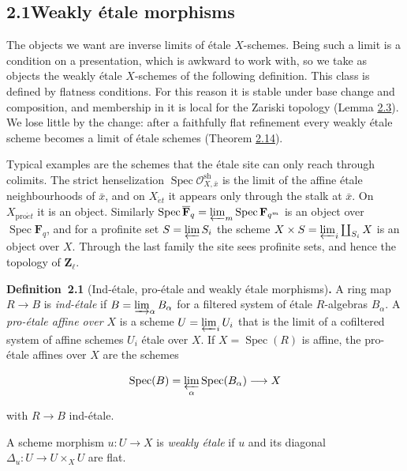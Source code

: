 \documentclass[11pt]{article}
\newenvironment{bpstatement}[2]{\par\addvspace{0.6\baselineskip}\noindent\textbf{#1}#2\textbf{.}\enspace\ignorespaces}
  {\par\addvspace{0.4\baselineskip}}
\begin{document}
\subsection*{\texorpdfstring{2.1\quad Weakly étale morphisms}{2.1 Weakly étale morphisms}}
\label{bp3}%
\label{bp4}%
The objects we want are inverse limits of étale \(X\)-schemes. Being such a limit is a condition on a presentation, which is awkward to work with, so we take as objects the weakly étale \(X\)-schemes of the following definition. This class is defined by flatness conditions. For this reason it is stable under base change and composition, and membership in it is local for the Zariski topology (Lemma \hyperref[bp10]{2.3}). We lose little by the change: after a faithfully flat refinement every weakly étale scheme becomes a limit of étale schemes (Theorem \hyperref[bp40]{2.14}).

Typical examples are the schemes that the étale site can only reach through colimits. The strict henselization \(\operatorname{Spec}\mathcal O^{\mathrm{sh}}_{X,\bar x}\) is the limit of the affine étale neighbourhoods of \(\bar x\), and on \(X_{\acute{e}t}\) it appears only through the stalk at \(\bar x\). On \(X_{\mathrm{pro}\acute{e}t}\) it is an object. Similarly \(\operatorname{Spec}\overline{\mathbf F}_q=\varprojlim_m\operatorname{Spec}\mathbf F_{q^m}\) is an object over \(\operatorname{Spec}\mathbf F_q\), and for a profinite set \(S=\varprojlim S_i\) the scheme \(X\times S=\varprojlim_i\coprod_{S_i}X\) is an object over \(X\). Through the last family the site sees profinite sets, and hence the topology of \(\mathbf Z_\ell\).

\label{bp5}%
\begin{bpstatement}{Definition~2.1}{ (Ind-étale, pro-étale and weakly étale morphisms)}
A ring map \(R\to B\) is \emph{ind-étale} if \(B=\varinjlim_\alpha B_\alpha\) for a filtered system of étale \(R\)-algebras \(B_\alpha\). A \emph{pro-étale affine over \(X\)} is a scheme \(U=\varprojlim_iU_i\) that is the limit of a cofiltered system of affine schemes \(U_i\) étale over \(X\). If \(X=\operatorname{Spec}(R)\) is affine, the pro-étale affines over \(X\) are the schemes

\[
\operatorname{Spec}(B)=\varprojlim_\alpha
\operatorname{Spec}(B_\alpha)\longrightarrow X
\]

with \(R\to B\) ind-étale.

A scheme morphism \(u:U\to X\) is \emph{weakly étale} if \(u\) and its diagonal \(\Delta_u:U\to U\times_XU\) are flat.
\end{bpstatement}
\end{document}
